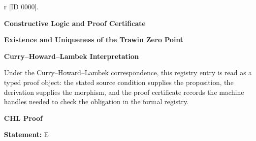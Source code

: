 \begin{minipage}[t]{0.49\linewidth}
\begin{minipage}[t]{0.49\linewidth}
\begin{minipage}[t]{0.49\linewidth}
\begin{minipage}[t]{0.49\linewidth}
\begin{minipage}[t]{0.49\linewidth}
\begin{minipage}[t]{0.49\linewidth}
\begin{minipage}[t]{0.49\linewidth}
\begin{minipage}[t]{0.49\linewidth}
\begin{minipage}[t]{0.49\linewidth}
\begin{minipage}[t]{0.49\linewidth}
\begin{minipage}[t]{0.49\linewidth}
\begin{minipage}[t]{0.49\linewidth}
\begin{minipage}[t]{0.49\linewidth}
\begin{minipage}[t]{0.49\linewidth}
\begin{minipage}[t]{0.49\linewidth}
\begin{minipage}[t]{0.49\linewidth}
\begin{minipage}[t]{0.49\linewidth}
\begin{minipage}[t]{0.49\linewidth}
\begin{minipage}[t]{0.49\linewidth}
\begin{minipage}[t]{0.49\linewidth}
\begin{minipage}[t]{0.49\linewidth}
\begin{minipage}[t]{0.49\linewidth}
\begin{minipage}[t]{0.49\linewidth}
\begin{minipage}[t]{0.49\linewidth}
\begin{minipage}[t]{0.49\linewidth}
\begin{minipage}[t]{0.49\linewidth}
\begin{minipage}[t]{0.49\linewidth}
\begin{minipage}[t]{0.49\linewidth}
\begin{minipage}[t]{0.49\linewidth}
\begin{minipage}[t]{0.49\linewidth}
\begin{minipage}[t]{0.49\linewidth}
\begin{minipage}[t]{0.49\linewidth}
\begin{minipage}[t]{0.49\linewidth}
\begin{minipage}[t]{0.49\linewidth}
\begin{minipage}[t]{0.49\linewidth}
\begin{minipage}[t]{0.49\linewidth}
\begin{minipage}[t]{0.49\linewidth}
\begin{minipage}[t]{0.49\linewidth}
\begin{minipage}[t]{0.49\linewidth}
\begin{minipage}[t]{0.49\linewidth}
\begin{minipage}[t]{0.49\linewidth}
\begin{minipage}[t]{0.49\linewidth}
\begin{minipage}[t]{0.49\linewidth}
\begin{minipage}[t]{0.49\linewidth}
\begin{minipage}[t]{0.49\linewidth}
\begin{minipage}[t]{0.49\linewidth}
\begin{minipage}[t]{0.49\linewidth}
\begin{minipage}[t]{0.49\linewidth}
\begin{minipage}[t]{0.49\linewidth}
\begin{minipage}[t]{0.49\linewidth}
\begin{minipage}[t]{0.49\linewidth}
\begin{minipage}[t]{0.49\linewidth}
\begin{minipage}[t]{0.49\linewidth}
\begin{minipage}[t]{0.49\linewidth}
\begin{minipage}[t]{0.49\linewidth}
\begin{minipage}[t]{0.49\linewidth}
\begin{minipage}[t]{0.49\linewidth}
\begin{minipage}[t]{0.49\linewidth}
\begin{minipage}[t]{0.49\linewidth}
\begin{minipage}[t]{0.49\linewidth}
\begin{minipage}[t]{0.49\linewidth}
\begin{minipage}[t]{0.49\linewidth}
\begin{minipage}[t]{0.49\linewidth}
\begin{minipage}[t]{0.49\linewidth}
r [ID 0000].
\par\endgroup

\clearpage
\begingroup\tzpsupportsetup
\noindent\textbf{\fontsize{10.8pt}{12.8pt}\selectfont [ID 0000] Constructive Logic and Proof Certificate}\par
\noindent\textbf{\fontsize{10pt}{12pt}\selectfont Existence and Uniqueness of the Trawin Zero Point}\par
\vspace{0.45em}
\begingroup
\footnotesize
\setlength{\parskip}{0.22em}
\setlength{\parindent}{0pt}
\noindent\textbf{Curry--Howard--Lambek Interpretation}\par
Under the Curry--Howard--Lambek correspondence, this registry entry is read as a typed proof
object: the stated source condition supplies the proposition, the derivation supplies the
morphism, and the proof certificate records the machine handles needed to check the obligation
in the formal registry.

\vspace{0.45em}
\noindent\textbf{CHL Proof}\par
\textbf{Statement:} E
\end{minipage}
\end{minipage}
\end{minipage}
\end{minipage}
\end{minipage}
\end{minipage}
\end{minipage}
\end{minipage}
\end{minipage}
\end{minipage}
\end{minipage}
\end{minipage}
\end{minipage}
\end{minipage}
\end{minipage}
\end{minipage}
\end{minipage}
\end{minipage}
\end{minipage}
\end{minipage}
\end{minipage}
\end{minipage}
\end{minipage}
\end{minipage}
\end{minipage}
\end{minipage}
\end{minipage}
\end{minipage}
\end{minipage}
\end{minipage}
\end{minipage}
\end{minipage}
\end{minipage}
\end{minipage}
\end{minipage}
\end{minipage}
\end{minipage}
\end{minipage}
\end{minipage}
\end{minipage}
\end{minipage}
\end{minipage}
\end{minipage}
\end{minipage}
\end{minipage}
\end{minipage}
\end{minipage}
\end{minipage}
\end{minipage}
\end{minipage}
\end{minipage}
\end{minipage}
\end{minipage}
\end{minipage}
\end{minipage}
\end{minipage}
\end{minipage}
\end{minipage}
\end{minipage}
\end{minipage}
\end{minipage}
\end{minipage}
\end{minipage}
\end{minipage}

